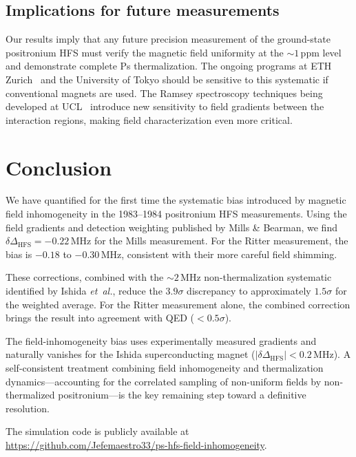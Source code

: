 \documentclass[twocolumn,pra,aps,superscriptaddress,floatfix,10pt]{revtex4-2}
\begin{document}
\subsection{Implications for future measurements}

Our results imply that any future precision measurement of the ground-state positronium HFS must verify the magnetic field uniformity at the $\sim 1$\,ppm level and demonstrate complete Ps thermalization. The ongoing programs at ETH Zurich~\cite{ThorpeWoods2026} and the University of Tokyo should be sensitive to this systematic if conventional magnets are used. The Ramsey spectroscopy techniques being developed at UCL~\cite{Newson2026} introduce new sensitivity to field gradients between the interaction regions, making field characterization even more critical.

\section{Conclusion}
\label{sec:conclusion}

We have quantified for the first time the systematic bias introduced by magnetic field inhomogeneity in the 1983--1984 positronium HFS measurements. Using the field gradients and detection weighting published by Mills \& Bearman, we find $\delta\Delta_\mathrm{HFS} = -0.22$\,MHz for the Mills measurement. For the Ritter measurement, the bias is $-0.18$ to $-0.30$\,MHz, consistent with their more careful field shimming.

These corrections, combined with the $\sim 2$\,MHz non-thermalization systematic identified by Ishida \textit{et~al.}, reduce the $3.9\sigma$ discrepancy to approximately $1.5\sigma$ for the weighted average. For the Ritter measurement alone, the combined correction brings the result into agreement with QED ($< 0.5\sigma$).

The field-inhomogeneity bias uses experimentally measured gradients and naturally vanishes for the Ishida superconducting magnet ($|\delta\Delta_\mathrm{HFS}| < 0.2$\,MHz). A self-consistent treatment combining field inhomogeneity and thermalization dynamics---accounting for the correlated sampling of non-uniform fields by non-thermalized positronium---is the key remaining step toward a definitive resolution.

\begin{acknowledgments}
The simulation code is publicly available at \url{https://github.com/Jefemaestro33/ps-hfs-field-inhomogeneity}.
\end{acknowledgments}


\end{document}
